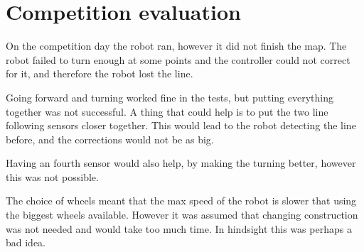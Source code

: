 \section{Competition evaluation}
On the competition day the robot ran, however it did not finish the map.
The robot failed to turn enough at some points and the controller could not correct for it, and therefore the robot lost the line.

Going forward and turning worked fine in the tests, but putting everything together was not successful.
A thing that could help is to put the two line following sensors closer together.
This would lead to the robot detecting the line before, and the corrections would not be as big. 

Having an fourth sensor would also help, by making the turning better, however this was not possible.

The choice of wheels meant that the max speed of the robot is slower that using the biggest wheels available.
However it was assumed that changing construction was not needed and would take too much time.
In hindsight this was perhaps a bad idea.